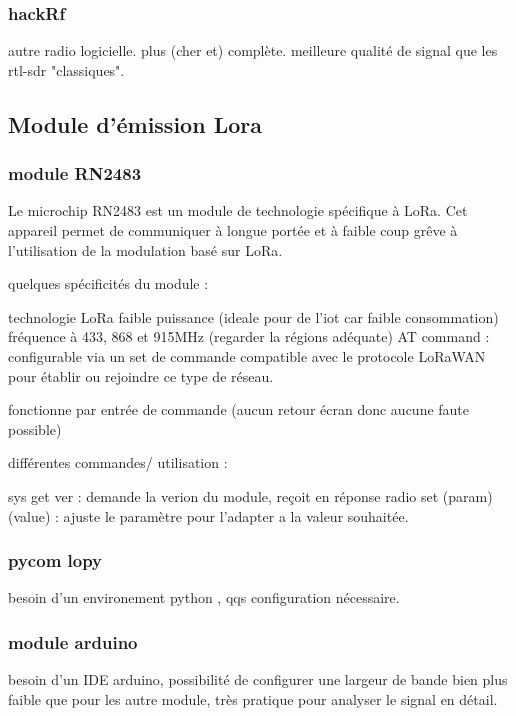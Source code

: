 \subsubsection{hackRf}

autre radio logicielle. plus (cher et) complète. meilleure qualité de signal que les rtl-sdr "classiques".

\subsection{Module d'émission Lora}

\subsubsection{module RN2483}

Le microchip RN2483 est un module de technologie spécifique à LoRa. Cet appareil permet de communiquer à longue portée et à faible coup grêve à l'utilisation de la modulation basé sur LoRa.

quelques spécificités du module :

technologie LoRa
faible puissance (ideale pour de l'iot car faible consommation)
fréquence à 433, 868 et 915MHz (regarder la régions adéquate)
AT command : configurable via un set de commande
compatible avec le protocole LoRaWAN pour établir ou rejoindre ce type de réseau.

fonctionne par entrée de commande (aucun retour écran donc aucune faute possible)

différentes commandes/ utilisation :

sys get ver : demande la verion du module, reçoit en réponse 
radio set (param) (value) : ajuste le paramètre pour l'adapter a la valeur souhaitée.

\subsubsection{pycom lopy}

besoin  d'un environement python , qqs configuration nécessaire.

\subsubsection{module arduino}

besoin d'un IDE arduino, possibilité de configurer une largeur de bande bien plus faible que pour les autre module, très pratique pour analyser le signal en détail.

